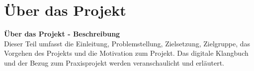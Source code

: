 
\newcommand{\fEinleitung}{010_einleitung}


\part{Über das Projekt}

\textbf{Über das Projekt - Beschreibung}\\
Dieser Teil umfasst die Einleitung, Problemstellung, Zielsetzung, Zielgruppe, das Vorgehen des Projekts und die Motivation zum Projekt.
Das digitale Klangbuch und der Bezug zum Praxisprojekt werden veranschaulicht und erläutert. 







